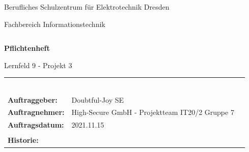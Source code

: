 \documentclass[a4paper,12pt,headings=small,ngerman,bibliography=totoc]{scrartcl}
\begin{document}
\pagestyle{empty}


\begin{center}
  \Large{Berufliches Schulzentrum für Elektrotechnik Dresden}\\
\end{center}

\begin{center}
  \Large{Fachbereich Informationstechnik}
\end{center}
\begin{verbatim}

\end{verbatim}
\begin{center}
  \textbf{\LARGE{Pflichtenheft}}
\end{center}

\begin{center}
  \Large{Lernfeld 9 - Projekt 3}
\end{center}

\vspace{\fill}

\begin{flushleft}
  \begin{tabular}{lll}
                            &                                                & \\
                            &                                                & \\
                            &                                                & \\
                            &                                                & \\
                            &                                                & \\
                            &                                                & \\
    \textbf{Auftraggeber:}  & Doubtful-Joy SE                                & \\
    \textbf{Auftragnehmer:} & High-Secure GmbH - Projektteam IT20/2 Gruppe 7 & \\
    \textbf{Auftragsdatum:} & 2021.11.15                                     & \\
                            &                                                & \\
    \textbf{Historie:}      &                                                & \\
  \end{tabular}
\end{flushleft}
\end{document}
